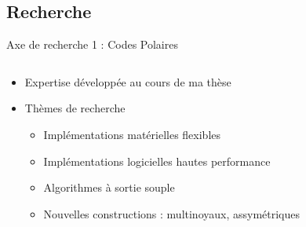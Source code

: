 \documentclass[t,compress,mathserif,12pt,xcolor=dvipsnames]{beamer}
\begin{document}
\subsection{Recherche}
\begin{frame}[t]{Axe de recherche 1 : Codes Polaires}
  \begin{minipage}[t][5.0cm][t]{\textwidth}
    \begin{columns}[T]
      \begin{column}{0.63\textwidth}
        \vspace{-0.5cm}
        \begin{itemize}
          \item<+-> Expertise développée au cours de ma thèse
          \item<+-> Thèmes de recherche
          \begin{itemize}
            \item<+-> Implémentations matérielles flexibles
            \item<+-> Implémentations logicielles hautes performance
            \item<+-> Algorithmes à sortie souple
            \item<+-> Nouvelles constructions : multinoyaux, assymétriques
          \end{itemize}
        \end{itemize}
      \end{column}
      \begin{column}{0.04\textwidth}


\end{column}
\end{columns}
\end{minipage}
\end{frame}
\end{document}
